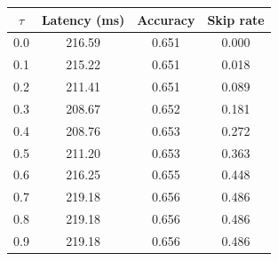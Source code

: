 \begin{tabular}{cccc}
\toprule
$\tau$ & Latency (ms) & Accuracy & Skip rate \\
\midrule
0.0 & 216.59 & 0.651 & 0.000 \\
0.1 & 215.22 & 0.651 & 0.018 \\
0.2 & 211.41 & 0.651 & 0.089 \\
0.3 & 208.67 & 0.652 & 0.181 \\
0.4 & 208.76 & 0.653 & 0.272 \\
0.5 & 211.20 & 0.653 & 0.363 \\
0.6 & 216.25 & 0.655 & 0.448 \\
0.7 & 219.18 & 0.656 & 0.486 \\
0.8 & 219.18 & 0.656 & 0.486 \\
0.9 & 219.18 & 0.656 & 0.486 \\
\bottomrule
\end{tabular}
